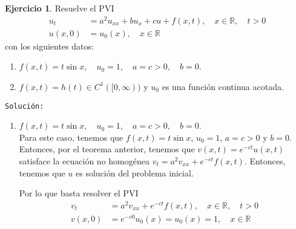 \documentclass{article}
\theoremstyle{plain}
\theoremstyle{definition}
\newtheorem{ex}[proposición]{Ejercicio}
\begin{document}
\begin{ex}
    Resuelve el PVI
    \begin{align*}
    u_t &= a^2 u_{xx} + bu_x + cu + f(x, t), \quad x \in \mathbb{R}, \quad t > 0\\
    u(x, 0) &= u_0(x), \quad x \in \mathbb{R}
    \end{align*}
    con los siguientes datos:
    \begin{enumerate}
        \item \( f(x, t) = t \sin x, \quad u_0 = 1, \quad a = c > 0, \quad b = 0 \).
        \item \( f(x, t) = h(t) \in C^1([0, \infty)) \) y \( u_0 \) es una función continua acotada.
    \end{enumerate}
    \texttt{Solución:}
    \begin{enumerate}
        \item \( f(x, t) = t \sin x, \quad u_0 = 1, \quad a = c > 0, \quad b = 0 \).\\
            Para este caso, tenemos que \( f(x, t) = t \sin x \), \( u_0 = 1 \), \( a = c > 0 \) y \( b = 0 \). Entonces, por el teorema anterior, tenemos que \( v(x, t) = e^{-ct} u(x, t) \) satisface la ecuación no homogénea \( v_t = a^2 v_{xx} + e^{-ct} f(x, t) \). Entonces, tenemos que $u$ es solución del problema inicial.

            Por lo que basta resolver el PVI
            \begin{align*}
                v_t &= a^2 v_{xx} + e^{-ct} f(x, t), \quad x \in \mathbb{R}, \quad t > 0\\
                v(x, 0) &= e^{-c0} u_0(x) = u_0(x) = 1, \quad x \in \mathbb{R}
            \end{align*}
            

\end{enumerate}
\end{ex}
\end{document}
